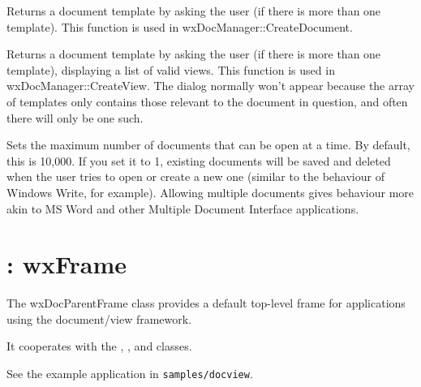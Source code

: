 
Returns a document template by asking the user (if there is more than one template).
This function is used in wxDocManager::CreateDocument.



Returns a document template by asking the user (if there is more than one template),
displaying a list of valid views. This function is used in wxDocManager::CreateView.
The dialog normally won't appear because the array of templates only contains
those relevant to the document in question, and often there will only be one such.



Sets the maximum number of documents that can be open at a time. By default, this
is 10,000. If you set it to 1, existing documents will be saved and deleted
when the user tries to open or create a new one (similar to the behaviour
of Windows Write, for example). Allowing multiple documents gives behaviour
more akin to MS Word and other Multiple Document Interface applications.



\section{: wxFrame}\label{wxdocparentframe}


The wxDocParentFrame class provides a default top-level frame for
applications using the document/view framework.

It cooperates with the , ,
\rtfsp{} and  classes.

See the example application in {\tt samples/docview}.



